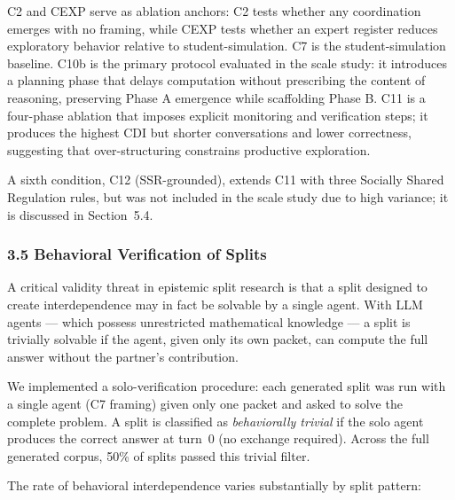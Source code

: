 \documentclass[
  11pt,
]{article}
\begin{document}
C2 and CEXP serve as ablation anchors: C2 tests whether any coordination emerges with no framing, while CEXP tests whether an expert register reduces exploratory behavior relative to student-simulation. C7 is the student-simulation baseline. C10b is the primary protocol evaluated in the scale study: it introduces a planning phase that delays computation without prescribing the content of reasoning, preserving Phase A emergence while scaffolding Phase B. C11 is a four-phase ablation that imposes explicit monitoring and verification steps; it produces the highest CDI but shorter conversations and lower correctness, suggesting that over-structuring constrains productive exploration.

A sixth condition, C12 (SSR-grounded), extends C11 with three Socially Shared Regulation rules, but was not included in the scale study due to high variance; it is discussed in Section~5.4.

\subsubsection{3.5 Behavioral Verification of Splits}\label{behavioral-verification-of-splits}

A critical validity threat in epistemic split research is that a split designed to create interdependence may in fact be solvable by a single agent. With LLM agents --- which possess unrestricted mathematical knowledge --- a split is trivially solvable if the agent, given only its own packet, can compute the full answer without the partner's contribution.

We implemented a solo-verification procedure: each generated split was run with a single agent (C7 framing) given only one packet and asked to solve the complete problem. A split is classified as \emph{behaviorally trivial} if the solo agent produces the correct answer at turn~0 (no exchange required). Across the full generated corpus, 50\% of splits passed this trivial filter.

The rate of behavioral interdependence varies substantially by split pattern:
\end{document}
